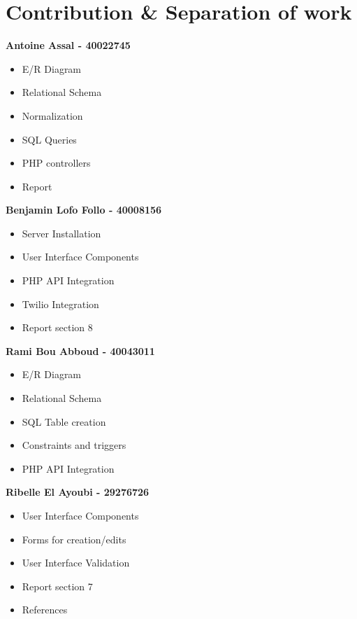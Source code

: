 \documentclass{article}
\begin{document}
\section{Contribution \& Separation of work}
\textbf{Antoine Assal - 40022745}
\begin{itemize}
    \item E/R Diagram
    \item Relational Schema 
    \item Normalization
    \item SQL Queries
    \item PHP controllers
    \item Report
\end{itemize}
\textbf{Benjamin Lofo Follo  - 40008156}
\begin{itemize}
    \item Server Installation
    \item User Interface Components
    \item PHP API Integration
    \item Twilio Integration 
    \item Report section 8
\end{itemize}
\textbf{Rami Bou Abboud  - 40043011}
\begin{itemize}
    \item E/R Diagram
    \item Relational Schema
    \item SQL Table creation
    \item Constraints and triggers
    \item PHP API Integration
\end{itemize}
\textbf{Ribelle El Ayoubi  - 29276726}
\begin{itemize}
    \item User Interface Components
    \item Forms for creation/edits
    \item User Interface Validation
    \item Report section 7 
    \item References
\end{itemize}
\end{document}
